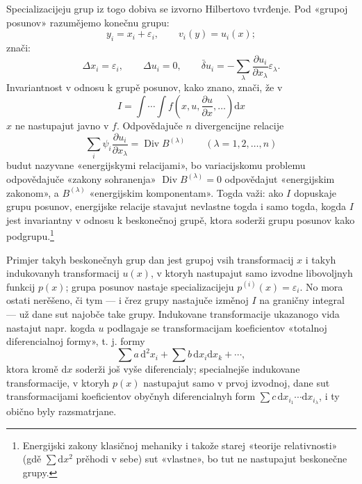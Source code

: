\documentclass[11pt]{article}
\providecommand{\eps}{\varepsilon}
\providecommand{\D}{\Delta}
\providecommand{\p}{\partial}
\providecommand{\dd}{\mathrm d}
\DeclareMathOperator{\Div}{Div}
\providecommand{\bd}{\bar{\delta}}
\begin{document}
Specializacijeju grup iz togo dobiva se izvorno Hilbertovo tvrđenje. Pod «grupoj posunov» razumějemo konečnu grupu:
\[
y_i=x_i+\eps_i,\qquad v_i(y)=u_i(x);
\]
znači:
\[
\D x_i=\eps_i,\qquad \D u_i=0,\qquad
\bd u_i=-\sum_\lambda\frac{\p u_i}{\p x_\lambda}\eps_\lambda.
\]
Invariantnost v odnosu k grupě posunov, kako znano, znači, že v
\[
I=\int\!\cdots\!\int f\!\left(x,u,\frac{\p u}{\p x},\ldots\right)\dd x
\]
\(x\) ne nastupajut javno v \(f\). Odpovědajuče \(n\) divergencijne relacije
\[
\sum_i\psi_i\frac{\p u_i}{\p x_\lambda}=\Div B^{(\lambda)}
\qquad(\lambda=1,2,\ldots,n)
\]
budut nazyvane «energijskymi relacijami», bo variacijskomu problemu odpovědajuče «zakony sohranenja» \(\Div B^{(\lambda)}=0\) odpovědajut «energijskim zakonom», a \(B^{(\lambda)}\) «energijskim komponentam». Togda važi: ako \(I\) dopuskaje grupu posunov, energijske relacije stavajut nevlastne togda i samo togda, kogda \(I\) jest invariantny v odnosu k beskonečnoj grupě, ktora soderži grupu posunov kako podgrupu.\footnote{Energijski zakony klasičnoj mehaniky i takože starej «teorije relativnosti» (gdě \(\sum \dd x^2\) prěhodi v sebe) sut «vlastne», bo tut ne nastupajut beskonečne grupy.}

Primjer takyh beskonečnyh grup dan jest grupoj vsih transformacij \(x\) i takyh indukovanyh transformacij \(u(x)\), v ktoryh nastupajut samo izvodne libovoljnyh funkcij \(p(x)\); grupa posunov nastaje specializacijeju \(p^{(i)}(x)=\eps_i\). No mora ostati nerěšeno, či tym --- i črez grupy nastajuče izměnoj \(I\) na graničny integral --- už dane sut najobče take grupy. Indukovane transformacije ukazanogo vida nastajut napr. kogda \(u\) podlagaje se transformacijam koeficientov «totalnoj diferencialnoj formy», t. j. formy
\[
\sum a\,\dd^2x_i+\sum b\,\dd x_i\dd x_k+\cdots,
\]
ktora kromě \(\dd x\) soderži još vyše diferencialy; specialnejše indukovane transformacije, v ktoryh \(p(x)\) nastupajut samo v prvoj izvodnoj, dane sut transformacijami koeficientov obyčnyh diferencialnyh form \(\sum c\,\dd x_{i_1}\cdots \dd x_{i_\lambda}\), i ty obično byly razsmatrjane.
\end{document}
